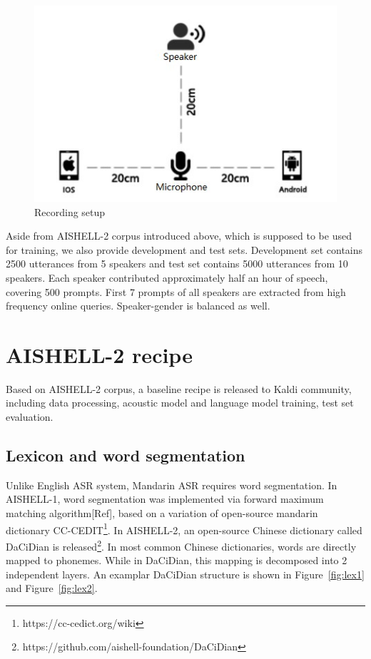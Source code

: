 \documentclass[a4paper]{article}
\begin{document}
\begin{figure}[t]
  \centering
  \includegraphics[width=\linewidth]{setup.jpg}
  \caption{Recording setup}
  \label{fig:setup}
\end{figure}

\noindent Aside from AISHELL-2 corpus introduced above, which is supposed to be used for training, 
we also provide development and test sets. 
Development set contains 2500 utterances from 5 speakers and test set contains 5000 utterances from 10 speakers. 
Each speaker contributed approximately half an hour of speech, covering 500 prompts. 
First 7 prompts of all speakers are extracted from high frequency online queries. Speaker-gender is balanced as well.

\section{AISHELL-2 recipe}

Based on AISHELL-2 corpus, a baseline recipe is released to Kaldi community, including
data processing, acoustic model and language model training, test set evaluation.

\subsection{Lexicon and word segmentation}

Unlike English ASR system, Mandarin ASR requires word segmentation. 
In AISHELL-1, word segmentation was implemented via forward
maximum matching algorithm[Ref], based on a variation of open-source mandarin
dictionary CC-CEDIT\footnote{https://cc-cedict.org/wiki}. In AISHELL-2, an
open-source Chinese dictionary called DaCiDian is
released\footnote{https://github.com/aishell-foundation/DaCiDian}. In most
common Chinese dictionaries, words are directly mapped to phonemes. While in
DaCiDian, this mapping is decomposed into 2 independent layers. An examplar
DaCiDian structure is shown in Figure~\ref{fig:lex1} and Figure~\ref{fig:lex2}.
\end{document}
